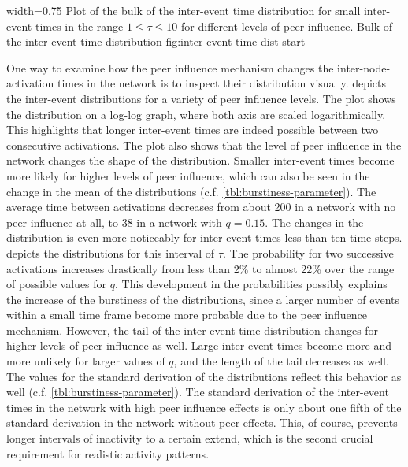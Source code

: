       {width=0.75\textwidth}
      {Plot of the bulk of the inter-event time distribution for small inter-event times in the range \( 1 \leq \tau \leq 10 \) for different levels of peer influence.}
      {Bulk of the inter-event time distribution}
      {fig:inter-event-time-dist-start}


One way to examine how the peer influence mechanism changes the inter-node-activation times in the network is to inspect their distribution visually.
 depicts the inter-event distributions for a variety of peer influence levels.
The plot shows the distribution on a log-log graph, where both axis are scaled logarithmically.
This highlights that longer inter-event times are indeed possible between two consecutive activations.
The plot also shows that the level of peer influence in the network changes the shape of the distribution.
Smaller inter-event times become more likely for higher levels of peer influence, which can also be seen in the change in the mean of the distributions (c.f. \cref{tbl:burstiness-parameter}).
The average time between activations decreases from about 200 in a network with no peer influence at all, to 38 in a network with \( q = 0.15 \).
The changes in the distribution is even more noticeably for inter-event times less than ten time steps.
 depicts the distributions for this interval of \( \tau \).
The probability for two successive activations increases drastically from less than 2\% to almost 22\% over the range of possible values for \( q \).
This development in the probabilities possibly explains the increase of the burstiness of the distributions, since a larger number of events within a small time frame become more probable due to the peer influence mechanism.
However, the tail of the inter-event time distribution changes for higher levels of peer influence as well.
Large inter-event times become more and more unlikely for larger values of \( q \), and the length of the tail decreases as well.
The values for the standard derivation of the distributions reflect this behavior as well (c.f. \cref{tbl:burstiness-parameter}).
The standard derivation of the inter-event times in the network with high peer influence effects is only about one fifth of the standard derivation in the network without peer effects.
This, of course, prevents longer intervals of inactivity to a certain extend, which is the second crucial requirement for realistic activity patterns.


